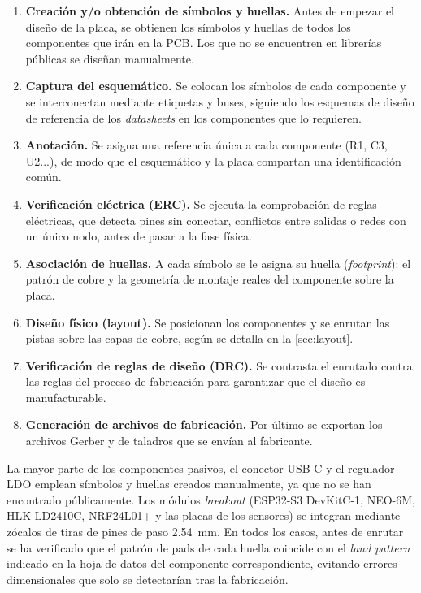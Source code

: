 \begin{enumerate}
    \item \textbf{Creación y/o obtención de símbolos y huellas.} Antes de empezar el diseño de la placa, se obtienen los símbolos y huellas de todos los componentes que irán en la PCB. Los que no se encuentren en librerías públicas se diseñan manualmente. 
    \item \textbf{Captura del esquemático.} Se colocan los símbolos de cada componente y se interconectan mediante etiquetas y buses, siguiendo los esquemas de diseño de referencia de los \textit{datasheets} en los componentes que lo requieren.
    \item \textbf{Anotación.} Se asigna una referencia única a cada componente (R1, C3, U2...), de modo que el esquemático y la placa compartan una identificación común.
    \item \textbf{Verificación eléctrica (ERC).} Se ejecuta la comprobación de reglas eléctricas, que detecta pines sin conectar, conflictos entre salidas o redes con un único nodo, antes de pasar a la fase física.
    \item \textbf{Asociación de huellas.} A cada símbolo se le asigna su huella (\textit{footprint}): el patrón de cobre y la geometría de montaje reales del componente sobre la placa.
    \item \textbf{Diseño físico (layout).} Se posicionan los componentes y se enrutan las pistas sobre las capas de cobre, según se detalla en la \cref{sec:layout}.
    \item \textbf{Verificación de reglas de diseño (DRC).} Se contrasta el enrutado contra las reglas del proceso de fabricación para garantizar que el diseño es manufacturable.
    \item \textbf{Generación de archivos de fabricación.} Por último se exportan los archivos Gerber y de taladros que se envían al fabricante.
\end{enumerate}

La mayor parte de los componentes pasivos, el conector USB-C y el regulador LDO emplean símbolos y huellas creados manualmente, ya que no se han encontrado públicamente. Los módulos \textit{breakout} (ESP32-S3 DevKitC-1, NEO-6M, HLK-LD2410C, NRF24L01+ y las placas de los sensores) se integran mediante zócalos de tiras de pines de paso \SI{2.54}{\milli\meter}.
En todos los casos, antes de enrutar se ha verificado que el patrón de pads de cada huella coincide con el \textit{land pattern} indicado en la hoja de datos del componente correspondiente, evitando errores dimensionales que solo se detectarían tras la fabricación.

